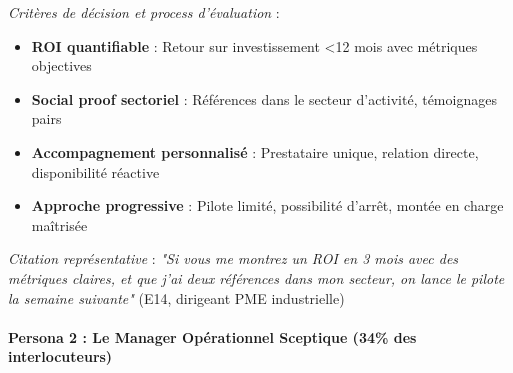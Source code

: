 \medskip
\emph{Critères de décision et process d'évaluation} :
\begin{itemize}
    \item \textbf{ROI quantifiable} : Retour sur investissement <12 mois avec métriques objectives
    \item \textbf{Social proof sectoriel} : Références dans le secteur d'activité, témoignages pairs
    \item \textbf{Accompagnement personnalisé} : Prestataire unique, relation directe, disponibilité réactive
    \item \textbf{Approche progressive} : Pilote limité, possibilité d'arrêt, montée en charge maîtrisée
\end{itemize}
\medskip
\emph{Citation représentative} : \emph{"Si vous me montrez un ROI en 3 mois avec des métriques claires, et que j'ai deux références dans mon secteur, on lance le pilote la semaine suivante"} (E14, dirigeant PME industrielle)
\\\\
\textbf{Persona 2 : Le Manager Opérationnel Sceptique (34\% des interlocuteurs)}

